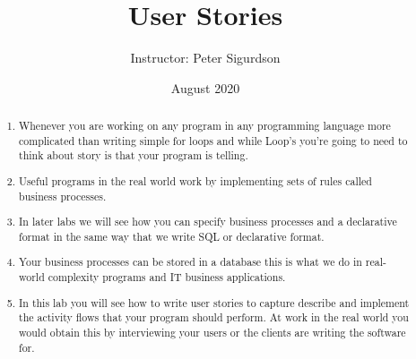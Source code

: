 \documentclass{article}
\title{User Stories}
\author{Instructor: Peter Sigurdson }
\date{August 2020}
\begin{document}
\maketitle
\begin{abstract}
\begin{enumerate}
    \item Whenever you are working on any program in any programming language more complicated than writing simple for loops and while Loop's you're going to need to think about story is that your program is telling.
    
    \item Useful programs in the real world work by implementing sets of rules called business processes.
    
    \item In later labs we will see how you can specify business processes and a declarative format in the same way that we write SQL or declarative format.
    
    \item Your business processes can be stored in a database this is what we do in real-world complexity programs and IT business applications.
    
    \item In this lab you will see how to write user stories to capture describe and implement the activity flows that your program should perform. At work in the real world you would obtain this by interviewing your users or the clients are writing the software for.
    \end{enumerate}
    
\end{abstract}

\end{document}
